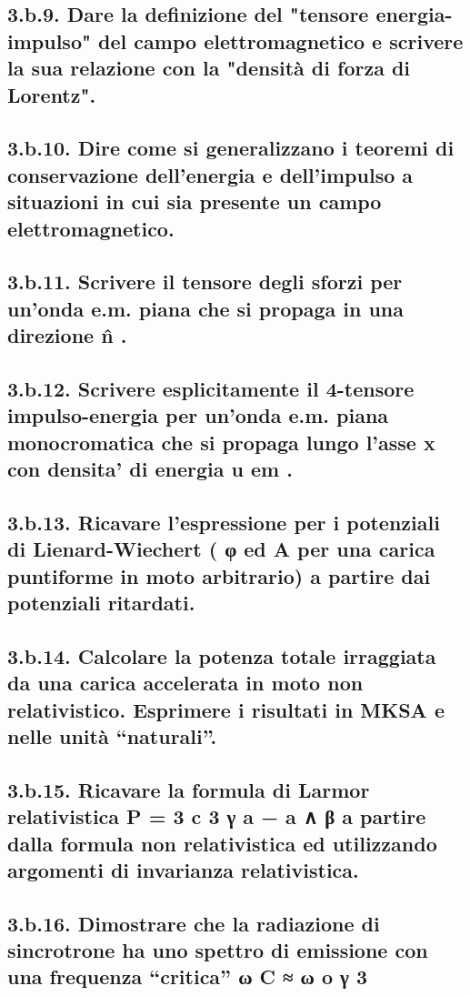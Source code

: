 \subsection*{3.b.9. Dare la definizione del "tensore energia-impulso" del campo elettromagnetico e scrivere la sua relazione con la "densità di forza di Lorentz".}

\subsection*{3.b.10. Dire come si generalizzano i teoremi di conservazione dell'energia e dell'impulso a situazioni in cui sia presente un campo elettromagnetico.}

\subsection*{3.b.11. Scrivere il tensore degli sforzi per un’onda e.m. piana che si propaga in una direzione n̂ .}

\subsection*{3.b.12. Scrivere esplicitamente il 4-tensore impulso-energia per un’onda e.m. piana monocromatica che si propaga lungo l’asse x con densita’ di energia u em .}

\subsection*{3.b.13. Ricavare l’espressione per i potenziali di Lienard-Wiechert ( φ ed A per una carica puntiforme in moto arbitrario) a partire dai potenziali ritardati.}

\subsection*{3.b.14. Calcolare la potenza totale irraggiata da una carica accelerata in moto non relativistico. Esprimere i risultati in MKSA e nelle unità “naturali”.}

\subsection*{3.b.15. Ricavare la formula di Larmor relativistica P = 3 c 3 γ a − a ∧ β a partire dalla formula non relativistica ed utilizzando argomenti di invarianza relativistica.}

\subsection*{3.b.16. Dimostrare che la radiazione di sincrotrone ha uno spettro di emissione con una frequenza “critica” ω C ≈ ω o γ 3}

